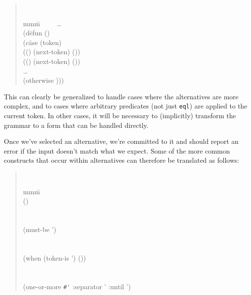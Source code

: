 \begin{quote}{\tt
\begin{tabbing}
mmm\=\kill
   \BNFdef\  
             \ordef\  
             \ordef\ \ldots\ 
             \ordef\  \\
    \>\expandsto
      (d\=efun  () \\
    \>  \>(c\=ase (token) \\
    \>  \>  \>(() (next-token) ()) \\
    \>  \>  \>(() (next-token) ()) \\
    \>  \>  \>\ldots \\
    \>  \>  \>(otherwise )))
\end{tabbing}}
\end{quote}

This can clearly be generalized to handle cases where the alternatives
are more complex, and to cases where arbitrary predicates (not just
{\tt eql}) are applied to the current token.  In other cases, it will
be necessary to (implicitly) transform the grammar to a form that can
be handled directly. %

Once we've selected an alternative, we're committed to it and
should report an error if the input doesn't match what we expect.
Some of the more common constructs that occur within alternatives
can therefore be translated as follows:

\begin{quote}{\tt
\begin{tabbing}
mmm\=\kill
   \\
     \>\expandsto ()\\
\\
   \\
     \>\expandsto (must-be ') \\
\\
    \\
     \>\expandsto (when (token-is ') ()) \\
\\
      \\
     \>\expandsto
       (one-or-more \verb|#'| 
                    :separator '
                    :until ')
\end{tabbing}}
\end{quote}

